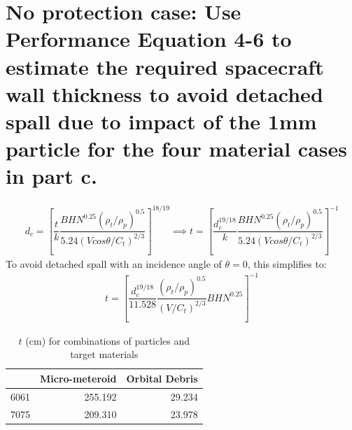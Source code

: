 \documentclass[onecolumn,10pt]{jhwhw}
\begin{document}
\part{No protection case: Use Performance Equation 4-6 to estimate the required spacecraft wall thickness to avoid detached spall due to impact of the 1mm particle for the four material cases in part c.}

\begin{align*}
d_c = \left[ \dfrac{t}{k} \dfrac{BHN^{0.25} \left( \rho_t/\rho_p \right)^{0.5}}{5.24\left( V cos \theta / C_t \right)^{2/3}} \right]^{18/19}
\implies
t = \left[ \dfrac{d_c^{19/18}}{k} \dfrac{BHN^{0.25} \left( \rho_t/\rho_p \right)^{0.5}}{5.24\left( V cos \theta / C_t \right)^{2/3}} \right]^{-1}
\end{align*}
To avoid detached spall with an incidence angle of $\theta = 0$, this simplifies to:
\begin{align*}
t = \left[\dfrac{d_c^{19/18}}{11.528} \dfrac{\left( \rho_t/\rho_p \right)^{0.5}}{\left( V / C_t \right)^{2/3}} BHN^{0.25} \right]^{-1}
\end{align*}

\begin{table}[h]
\begin{center}
\begin{tabular}{r|rr}
\toprule
      &   Micro-meteroid &   Orbital Debris \\
\midrule
 6061 &          255.192 &           29.234 \\
 7075 &          209.310 &           23.978 \\
\bottomrule
\end{tabular}
\end{center}
\caption{$t$ (cm) for combinations of particles and target materials}
\end{table}
\end{document}
